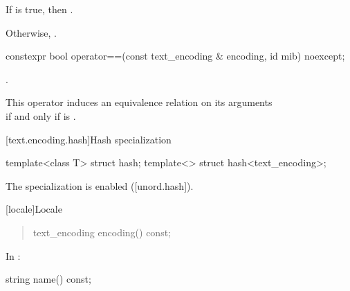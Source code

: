 \documentclass{wg21}
\begin{document}
\begin{addedblock}
\begin{itemdescr}
    If  is true, then .

    Otherwise, .

\end{itemdescr}

\begin{itemdecl}
    constexpr bool operator==(const text_encoding & encoding, id mib) noexcept;
\end{itemdecl}

\begin{itemdescr}
    \returns {}.

    \remarks This operator induces an equivalence relation on its arguments\\
    if and only if  is .
\end{itemdescr}

[text.encoding.hash]{Hash specialization}

\begin{itemdecl}
template<class T> struct hash;
template<> struct hash<text_encoding>;
\end{itemdecl}

\begin{itemdescr}
The specialization is enabled ([unord.hash]).
\end{itemdescr}

\end{addedblock}


[locale]{Locale}

\begin{quote}
\begin{codeblock}
namespace std {
  class locale {
  public:
    [...]

    // locale operations
    string name() const;
\end{codeblock}
\begin{addedblock}
\begin{codeblock}
    text_encoding encoding() const;
\end{codeblock}
\end{addedblock}
\begin{codeblock}
  };
}
\end{codeblock}
\end{quote}

In :

\begin{itemdecl}
string name() const;
\end{itemdecl}
\end{document}
